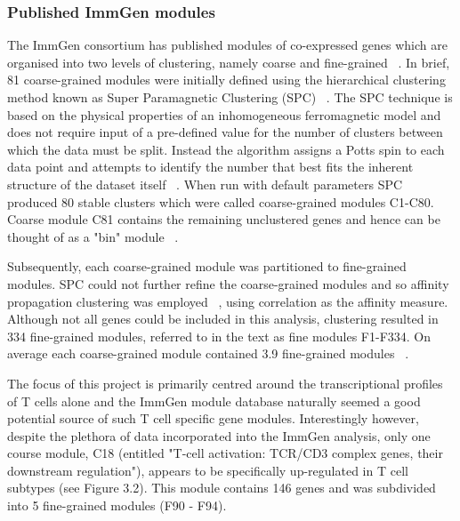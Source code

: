 \subsubsection{Published ImmGen modules}

The ImmGen consortium has published modules of co-expressed genes which are organised into two levels of clustering, namely coarse and fine-grained ~\autocite{Joj2013}. In brief, 81 coarse-grained modules were initially defined using the hierarchical clustering method known as Super Paramagnetic Clustering (SPC) ~\autocite{Bla1996}. The SPC technique is based on the physical properties of an inhomogeneous ferromagnetic model and does not require input of a pre-defined value for the number of clusters between which the data must be split. Instead the algorithm assigns a Potts spin to each data point and attempts to identify the number that best fits the inherent structure of the dataset itself ~\autocite{Bla1996}. When run with default parameters SPC produced 80 stable clusters which were called coarse-grained modules C1-C80. Coarse module C81 contains the remaining unclustered genes and hence can be thought of as a "bin" module ~\autocite{Joj2013}. 

Subsequently, each coarse-grained module was partitioned to fine-grained modules. SPC could not further refine the coarse-grained modules and so affinity propagation clustering was employed ~\autocite{Fre2007}, using correlation as the affinity measure. Although not all genes could be included in this analysis, clustering resulted in 334 fine-grained modules, referred to in the text as fine modules F1-F334. On average each coarse-grained module contained 3.9 fine-grained modules ~\autocite{Joj2013}. 

The focus of this project is primarily centred around the transcriptional profiles of T cells alone and the ImmGen module database naturally seemed a good potential source of such T cell specific gene modules. Interestingly however, despite the plethora of data incorporated into the ImmGen analysis, only one course module, C18 (entitled "T-cell activation: TCR/CD3 complex genes, their downstream regulation"), appears to be specifically up-regulated in T cell subtypes (see Figure 3.2). This module contains 146 genes and was subdivided into 5 fine-grained modules (F90 - F94). 

